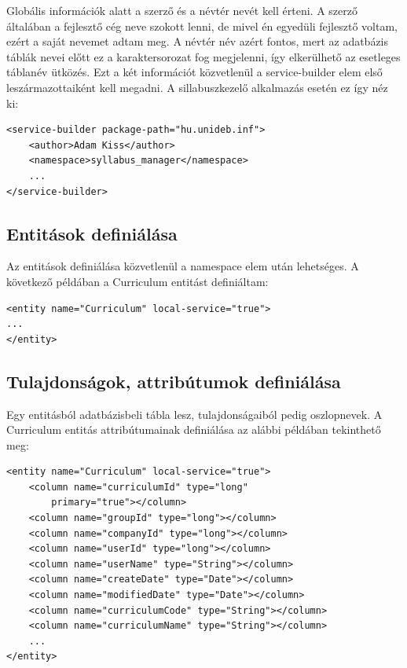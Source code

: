 \documentclass[hidelinks, 12pt, a4paper]{report}
\begin{document}
Globális információk alatt a szerző és a névtér nevét kell érteni. A szerző általában a fejlesztő cég neve szokott lenni, de mivel én egyedüli fejlesztő voltam, ezért a saját nevemet adtam meg. A névtér név azért fontos, mert az adatbázis táblák nevei előtt ez a karaktersorozat fog megjelenni, így elkerülhető az esetleges táblanév ütközés. Ezt a két információt közvetlenül a service-builder elem első leszármazottaiként kell megadni. A sillabuszkezelő alkalmazás esetén ez így néz ki:

\begin{minipage}{\linewidth}
\begin{lstlisting}[basicstyle=\small]
<service-builder package-path="hu.unideb.inf">
	<author>Adam Kiss</author>
	<namespace>syllabus_manager</namespace>
	...
</service-builder>
\end{lstlisting}
\end{minipage}

\subsection{Entitások definiálása}

Az entitások definiálása közvetlenül a namespace elem után lehetséges. A következő példában a Curriculum entitást definiáltam:

\begin{minipage}{\linewidth}
\begin{lstlisting}[basicstyle=\small]
<entity name="Curriculum" local-service="true">
...
</entity>
\end{lstlisting}
\end{minipage}

\subsection{Tulajdonságok, attribútumok definiálása}

Egy entitásból adatbázisbeli tábla lesz, tulajdonságaiból pedig oszlopnevek. A Curriculum entitás attribútumainak definiálása az alábbi példában tekinthető meg:

\begin{minipage}{\linewidth}
\begin{lstlisting}[basicstyle=\small]
<entity name="Curriculum" local-service="true">
	<column name="curriculumId" type="long"
		primary="true"></column>
	<column name="groupId" type="long"></column>
	<column name="companyId" type="long"></column>
	<column name="userId" type="long"></column>
	<column name="userName" type="String"></column>
	<column name="createDate" type="Date"></column>
	<column name="modifiedDate" type="Date"></column>
	<column name="curriculumCode" type="String"></column>
	<column name="curriculumName" type="String"></column>
	...
</entity>
\end{lstlisting}
\end{minipage}
\end{document}
